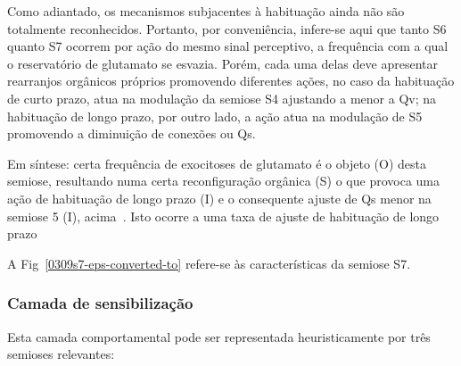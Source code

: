 \begin{itemize}
	Como adiantado, os mecanismos subjacentes à habituação ainda não são totalmente reconhecidos. Portanto, por conveniência, infere-se aqui que tanto S6 quanto S7 ocorrem por ação do mesmo sinal perceptivo, a frequência com a qual o reservatório de glutamato se esvazia. Porém, cada uma delas deve apresentar rearranjos orgânicos próprios promovendo diferentes ações, no caso da habituação de curto prazo, atua na modulação da semiose S4 ajustando a menor a Qv; na habituação de longo prazo, por outro lado, a ação atua na modulação de S5 promovendo a diminuição de conexões ou Qs.

	Em síntese: certa frequência de exocitoses de glutamato
	é o objeto (O) desta semiose, resultando numa certa reconfiguração orgânica (S) o que provoca uma ação de habituação de longo prazo (I) e o consequente ajuste de Qs menor na semiose 5 (I), acima~\cite{kandel06,kandel00}. Isto ocorre a uma taxa de ajuste de habituação de longo prazo

	A Fig~\ref{0309s7-eps-converted-to} refere-se às características da semiose S7.


\end{itemize}

\subsubsection*{Camada de sensibilização}
Esta camada comportamental pode ser representada heuristicamente por três semioses relevantes:

